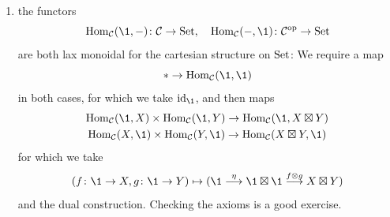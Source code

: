 \begin{enumerate}[label=\roman*)]
                where the former map is the canonical bilinear form, which can conversely be used to construct the map
                \begin{equation*}
                    \mathbb{Z}[S \times T] \to \mathbb{Z}[S] \otimes \mathbb{Z}[T]
                \end{equation*}
                via \ref{chIV-6-ii}. I don't think there are any refinements in the final case $(\Set, +)$ and $(\Ab, \otimes)$.
            \item 
                the functors
                \begin{equation*}
                    \Hom_{\Cc}(\1, -) \colon \Cc \to \Set, \quad \Hom_{\Cc}(-, \1) \colon \Cc^{\op} \to \Set
                \end{equation*}
                are both lax monoidal for the cartesian structure on $\operatorname{Set}$: We require a map
                \begin{equation*}
                    * \to \Hom_{\Cc}(\1, \1)
                \end{equation*}
                in both cases, for which we take $\id_{\1}$, and then maps
                \begin{gather*}
                    \Hom_{\Cc}(\1, X) \times \Hom_{\Cc}(\1, Y) \to \Hom_{\Cc}(\1, X \boxtimes Y) \\
                    \Hom_{\Cc}(X, \1) \times \Hom_{\Cc}(Y, \1) \to \Hom_{\Cc}(X \boxtimes Y, \1)
                \end{gather*}
                for which we take
                \begin{equation*}
                    (f \colon \1 \to X, g \colon \1 \to Y) \mapsto (\1 \overset{\eta}{\longrightarrow} \1 \boxtimes \1 \overset{f \otimes g}{\longrightarrow} X \boxtimes Y)
                \end{equation*}
                and the dual construction. Checking the axioms is a good exercise.
        \end{enumerate}

